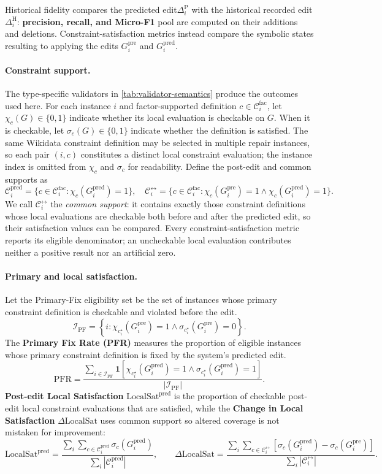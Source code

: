 \documentclass[a4paper,UKenglish,cleveref,autoref,thm-restate]{tgdk-v2021}
\newcommand{\locsat}{\mathrm{LocalSat}}
\newcommand{\Gpre}{G_i^{\mathrm{pre}}}
\newcommand{\Gpred}{G_i^{\mathrm{pred}}}
\newcommand{\histedit}{\Delta^{\mathrm{H}}}
\newcommand{\prededit}{\Delta^{\mathrm{P}}}
\begin{document}
Historical fidelity compares the predicted edit\(\prededit_i\) with the historical recorded edit \(\histedit_i\): \textbf{precision, recall, and Micro-F1} pool are computed on their additions and deletions. Constraint-satisfaction metrics instead compare the symbolic states resulting to applying the edits \(G_i^{\mathrm{pre}}\) and \(G_i^{\mathrm{pred}}\).

\paragraph*{Constraint support.} The type-specific validators in \cref{tab:validator-semantics} produce the outcomes used here. For each instance \(i\) and factor-supported definition \(c\in\mathcal{C}_i^{\mathrm{fac}}\), let \(\chi_c(G)\in\{0,1\}\) indicate whether its local evaluation is checkable on \(G\). When it is checkable, let \(\sigma_c(G)\in\{0,1\}\) indicate whether the definition is satisfied. The same Wikidata constraint definition may be selected in multiple repair instances, so each pair \((i,c)\) constitutes a distinct local constraint evaluation; the instance index is omitted from \(\chi_c\) and \(\sigma_c\) for readability. Define the post-edit and common supports as
\[
\mathcal{C}_i^{\mathrm{pred}}
=\{c\in\mathcal{C}_i^{\mathrm{fac}}:\chi_c(\Gpred)=1\},\quad
\mathcal{C}_i^{\leftrightarrow}
=\{c\in\mathcal{C}_i^{\mathrm{fac}}:\chi_c(\Gpre)=1\land\chi_c(\Gpred)=1\}.
\]
We call \(\mathcal{C}_i^{\leftrightarrow}\) the \emph{common support}: it contains exactly those constraint definitions whose local evaluations are checkable both before and after the predicted edit, so their satisfaction values can be compared.
Every constraint-satisfaction metric reports its eligible denominator; an uncheckable local evaluation contributes neither a positive result nor an artificial zero.

\paragraph*{Primary and local satisfaction.}
Let the Primary-Fix eligibility set be the set of instances whose primary constraint definition is checkable and violated before the edit.
\[
\mathcal{I}_{\mathrm{PF}}
=
\left\{
i:
\chi_{c_i^\star}(\Gpre)=1
\land
\sigma_{c_i^\star}(\Gpre)=0
\right\}.
\]
The \textbf{Primary Fix Rate (PFR)} measures the proportion of eligible instances whose primary constraint definition is fixed by the system's predicted edit.
\[
\mathrm{PFR}=
\frac{\sum_{i\in\mathcal{I}_{\mathrm{PF}}}
\mathbf{1}[\chi_{c_i^\star}(\Gpred)=1\land \sigma_{c_i^\star}(\Gpred)=1]}
{|\mathcal{I}_{\mathrm{PF}}|}.
\]
\textbf{Post-edit Local Satisfaction} \(\locsat^{\mathrm{pred}}\) is the proportion of checkable post-edit local constraint evaluations that are satisfied, while the \textbf{Change in Local Satisfaction} \(\Delta\locsat\) uses common support so altered coverage is not mistaken for improvement:
\[
\locsat^{\mathrm{pred}}=
\frac{\sum_i\sum_{c\in\mathcal{C}_i^{\mathrm{pred}}}\sigma_c(\Gpred)}
{\sum_i|\mathcal{C}_i^{\mathrm{pred}}|},
\qquad
\Delta\locsat=
\frac{\sum_i\sum_{c\in\mathcal{C}_i^{\leftrightarrow}}
[\sigma_c(\Gpred)-\sigma_c(\Gpre)]}
{\sum_i|\mathcal{C}_i^{\leftrightarrow}|}.
\]
\end{document}
